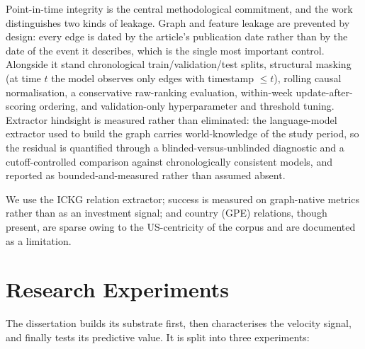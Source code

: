 \documentclass[a4paper,12pt]{report}
\begin{document}
Point-in-time integrity is the central methodological commitment, and the work
distinguishes two kinds of leakage. Graph and feature leakage are prevented by
design: every edge is dated by the article's publication date rather than by the
date of the event it describes, which is the single most important control.
Alongside it stand chronological train/validation/test splits, structural masking (at time
$t$ the model observes only edges with timestamp $\leq t$), rolling causal
normalisation, a conservative raw-ranking evaluation, within-week
update-after-scoring ordering, and validation-only hyperparameter and threshold
tuning. Extractor hindsight is measured rather than eliminated: the
language-model extractor used to build the graph carries world-knowledge of the
study period, so the residual is quantified through a blinded-versus-unblinded
diagnostic and a cutoff-controlled comparison against chronologically
consistent models, and reported as bounded-and-measured rather than assumed
absent.

We use the ICKG relation extractor; success is measured on graph-native metrics
rather than as an investment signal; and country (GPE) relations, though
present, are sparse owing to the US-centricity of the corpus and are documented
as a limitation.

\section{Research Experiments}
\label{sec:experiments}
The dissertation builds its substrate first, then characterises the velocity
signal, and finally tests its predictive value. It is split into three
experiments:
\end{document}
